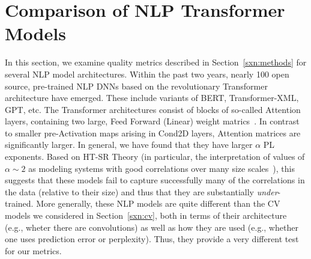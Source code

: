 \section{Comparison of NLP Transformer Models}
\label{sxn:nlp}

In this section, we examine quality metrics described in Section~\ref{sxn:methods} for several NLP model architectures.
%
Within the past two years, nearly 100 open source, pre-trained NLP DNNs based on the revolutionary Transformer architecture have emerged.
These include variants of BERT, Transformer-XML, GPT, etc.
%
The Transformer architectures consist of blocks of so-called Attention layers, containing two large, Feed Forward (Linear) weight matrics~\cite{Attn2017}. 
In contrast to smaller pre-Activation maps arising in Cond2D layers, Attention matrices are significantly larger.
In general, we have found that they have larger $\alpha$ PL exponents.
Based on HT-SR Theory (in particular, the interpretation of values of $\alpha \sim 2$ as modeling systems with good correlations over many size scales~\cite{BouchaudPotters03, SornetteBook}), this suggests that these models fail to capture successfully many of the correlations in the data (relative to their size) and thus that they are substantially \emph{under}-trained.
%
More generally, these NLP models are quite different than the CV models we considered in Section~\ref{sxn:cv}, both in terms of their architecture (e.g., wheter there are convolutions) as well as how they are used (e.g., whether one uses prediction error or perplexity).
Thus, they provide a very different test for our metrics.




